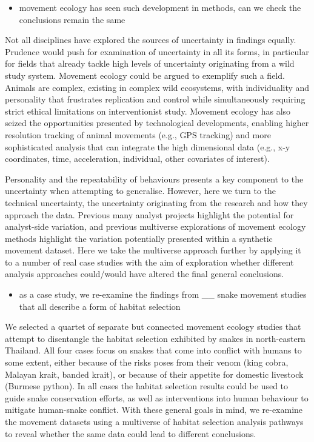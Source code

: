 \documentclass[10pt,a4paper]{article}
\providecommand{\tightlist}{%
  \setlength{\itemsep}{0pt}\setlength{\parskip}{0pt}}
\begin{document}
\begin{itemize}
\tightlist
\item
  movement ecology has seen such development in methods, can we check the conclusions remain the same
\end{itemize}

Not all disciplines have explored the sources of uncertainty in findings equally.
Prudence would push for examination of uncertainty in all its forms, in particular for fields that already tackle high levels of uncertainty originating from a wild study system.
Movement ecology could be argued to exemplify such a field.
Animals are complex, existing in complex wild ecosystems, with individuality and personality that frustrates replication and control while simultaneously requiring strict ethical limitations on interventionist study.
Movement ecology has also seized the opportunities presented by technological developments, enabling higher resolution tracking of animal movements (e.g., GPS tracking) and more sophisticated analysis that can integrate the high dimensional data (e.g., x-y coordinates, time, acceleration, individual, other covariates of interest).

Personality and the repeatability of behaviours presents a key component to the uncertainty when attempting to generalise.
However, here we turn to the technical uncertainty, the uncertainty originating from the research and how they approach the data.
Previous many analyst projects highlight the potential for analyst-side variation, and previous multiverse explorations of movement ecology methods highlight the variation potentially presented within a synthetic movement dataset.
Here we take the multiverse approach further by applying it to a number of real case studies with the aim of exploration whether different analysis approaches could/would have altered the final general conclusions.

\begin{itemize}
\tightlist
\item
  as a case study, we re-examine the findings from \_\_ snake movement studies that all describe a form of habitat selection
\end{itemize}

We selected a quartet of separate but connected movement ecology studies that attempt to disentangle the habitat selection exhibited by snakes in north-eastern Thailand.
All four cases focus on snakes that come into conflict with humans to some extent, either because of the risks poses from their venom (king cobra, Malayan krait, banded krait), or because of their appetite for domestic livestock (Burmese python).
In all cases the habitat selection results could be used to guide snake conservation efforts, as well as interventions into human behaviour to mitigate human-snake conflict.
With these general goals in mind, we re-examine the movement datasets using a multiverse of habitat selection analysis pathways to reveal whether the same data could lead to different conclusions.
\end{document}
